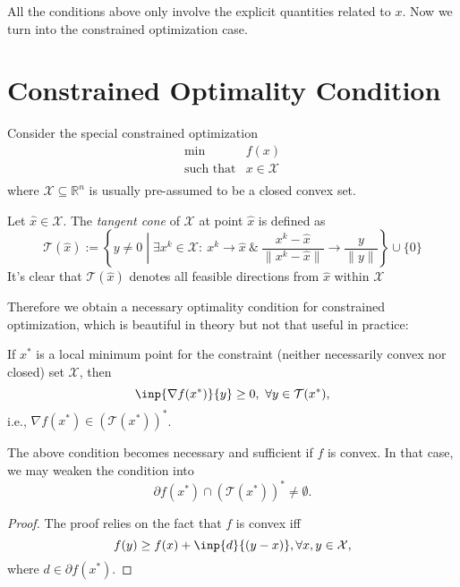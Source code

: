All the conditions above only involve the explicit quantities related to $x$. Now we turn into the constrained optimization case.

\section{Constrained Optimality Condition}
Consider the special constrained optimization
\begin{equation}\label{Eq:4:2}
\begin{array}{ll}
\min&f(x)\\
\mbox{such that}&x\in\mathcal{X}\\
\end{array}
\end{equation}
where $\mathcal{X}\subseteq\mathbb{R}^n$ is usually pre-assumed to be a closed convex set.

\begin{definition}
Let $\hat x\in\mathcal{X}$. The \emph{tangent cone} of $\mathcal{X}$ at point $\hat x$ is defined as
\[
\mathcal{T}(\hat x):=\left\{
y\ne0\middle|\exists x^k\in\mathcal{X}:\
x^k\to\hat x\
\&\
\frac{x^k-\hat x}{\|x^k-\hat x\|}\to\frac{y}{\|y\|}
\right\}\cup\{0\}
\]
It's clear that $\mathcal{T}(\hat x)$ denotes all feasible directions from $\hat x$ within $\mathcal{X}$
\end{definition}

Therefore we obtain a necessary optimality condition for constrained optimization, which is beautiful in theory but not that useful in practice:
\begin{theorem}\label{The:4:5}
If $x^*$ is a local minimum point for the constraint (neither necessarily convex nor closed) set $\mathcal{X}$, then
\[
\inp{\nabla f(x^*)}{y}\ge0,\ \forall y\in\mathcal{T}(x^*),
\]
i.e., $\nabla f(x^*)\in(\mathcal{T}(x^*))^*$.
\end{theorem}
\begin{theorem}
The above condition becomes necessary and sufficient if $f$ is convex. In that case, we may weaken the condition into
\[
\partial f(x^*)\cap (\mathcal{T}(x^*))^* \ne\emptyset.
\]
\end{theorem}

\begin{proof}
The proof relies on the fact that $f$ is convex iff
\[
f(y)\ge f(x)+\inp{d}{(y-x)},\forall x,y\in\mathcal{X},
\]
where $d\in\partial f(x^*)$.
\end{proof}

